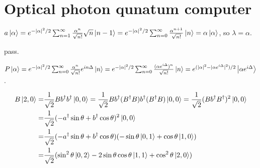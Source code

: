 \section{Optical photon qunatum computer}

\ex $a\left|\alpha\right\rangle = e^{-|\alpha|^2/2}\sum_{n=1}^\infty \frac{\alpha^n}{\sqrt{n!}} \sqrt{n}\left|n-1\right\rangle = e^{-|\alpha|^2/2}\sum_{n=0}^\infty \frac{\alpha^{n+1}}{\sqrt{n!}}\left|n\right\rangle = \alpha\left|\alpha\right\rangle$, so $\lambda = \alpha$.

\ex pass.

\ex $P\left|\alpha\right\rangle = e^{-|\alpha|^2/2}\sum_{n=0}^\infty \frac{\alpha^n}{\sqrt{n!}}e^{in\Delta}\left|n\right\rangle = e^{-|\alpha|^2/2}\sum_{n=0}^\infty \frac{(\alpha e^{i\Delta})^n}{\sqrt{n!}}\left|n\right\rangle = e^{(|\alpha|^2-|\alpha e^{i\Delta}|^2)/2}\left|\alpha e^{i\Delta}\right\rangle$.

\ex 

\ex 

\ex $$\begin{aligned}
    B\left|2,0\right\rangle
    = & \frac{1}{\sqrt{2}}Bb^\dagger b^\dagger\left|0,0\right\rangle
    = \frac{1}{\sqrt{2}}Bb^\dagger(B^\dagger B)b^\dagger(B^\dagger B)\left|0,0\right\rangle
    = \frac{1}{\sqrt{2}}(Bb^\dagger B^\dagger)^2\left|0,0\right\rangle
    \\ = & \frac{1}{\sqrt{2}}(-a^\dagger\sin\theta+b^\dagger\cos\theta)^2\left|0,0\right\rangle
    \\ = & \frac{1}{\sqrt{2}}(-a^\dagger\sin\theta+b^\dagger\cos\theta)(-\sin\theta\left|0,1\right\rangle+\cos\theta\left|1,0\right\rangle)
    \\ = & \frac{1}{\sqrt{2}}(\sin^2\theta\left|0,2\right\rangle-2\sin\theta\cos\theta\left|1,1\right\rangle+\cos^2\theta\left|2,0\right\rangle)
\end{aligned}$$

